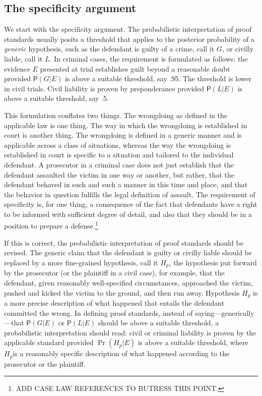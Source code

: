 \documentclass[
  10pt,
  dvipsnames,enabledeprecatedfontcommands]{scrartcl}
\newcommand{\pr}[1]{\ensuremath{\mathsf{P}(#1)}}
\begin{document}
\hypertarget{the-specificity-argument}{%
\subsection{The specificity argument}\label{the-specificity-argument}}

We start with the specificity argument. The probabilistic interpretation
of proof standards usually posits a threshold that applies to the
posterior probability of a \emph{generic} hypothesis, such as the
defendant is guilty of a crime, call it \(G\), or civilly liable, call
it \(L\). In criminal cases, the requirement is formulated as follows:
the evidence \(E\) presented at trial establishes guilt beyond a
reasonable doubt provided \(\pr{G \vert E}\) is above a suitable
threshold, say .95. The threshold is lower in civil trials. Civil
liability is proven by preponderance provided \(\pr{L \vert E}\) is
above a suitable threshold, say .5.

This formulation conflates two things. The wrongdoing as defined in the
applicable law is one thing. The way in which the wrongdoing is
established in court is another thing. The wrongdoing is defined in a
generic manner and is applicable across a class of situations, whereas
the way the wrongdoing is established in court is specific to a
situation and tailored to the individual defendant. A prosecutor in a
criminal case does not just establish that the defendant assaulted the
victim in one way or another, but rather, that the defendant behaved in
such and such a manner in this time and place, and that the behavior in
question fulfills the legal definition of assault. The requirement of
specificity is, for one thing, a consequence of the fact that defendants
have a right to be informed with sufficient degree of detail, and also
that they should be in a position to prepare a defense.\footnote{ADD
  CASE LAW REFERENCES TO BUTRESS THIS POINT.}

If this is correct, the probabilistic interpretation of proof standards
should be revised. The generic claim that the defendant is guilty or
civilly liable should be replaced by a more fine-grained hypothesis,
call it \(H_p\), the hypothesis put forward by the prosecutor (or the
plaintiff in a civil case), for example, that the defendant, given
reasonably well-specified circumstances, approached the victim, pushed
and kicked the victim to the ground, and then run away. Hypothesis
\(H_p\) is a more precise description of what happened that entails the
defendant committed the wrong. In defining proof standards, instead of
saying---generically---that \(\pr{G \vert E}\) or \(\pr{L \vert E}\)
should be above a suitable threshold, a probabilistic interpretation
should read: civil or criminal liability is proven by the applicable
standard provided \(\Pr(H_p \vert E)\) is above a suitable threshold,
where \(H_p\)is a reasonably specific description of what happened
according to the prosecutor or the plaintiff.
\end{document}
